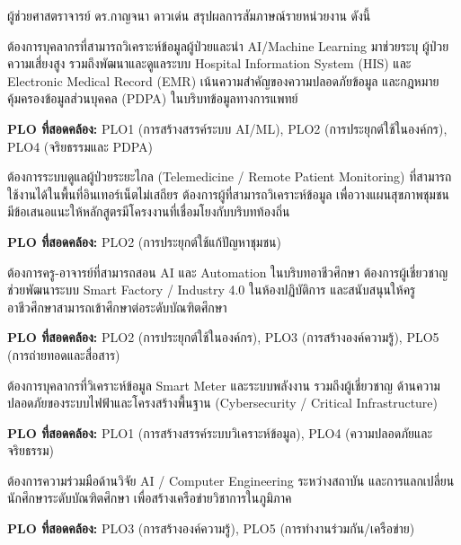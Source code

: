 \documentclass{meetingminutes}
\begin{document}
\vspace{8pt}
\noindent ผู้ช่วยศาสตราจารย์ ดร.กาญจนา ดาวเด่น สรุปผลการสัมภาษณ์รายหน่วยงาน ดังนี้


ต้องการบุคลากรที่สามารถวิเคราะห์ข้อมูลผู้ป่วยและนำ AI/Machine Learning มาช่วยระบุ
ผู้ป่วยความเสี่ยงสูง รวมถึงพัฒนาและดูแลระบบ Hospital Information System (HIS)
และ Electronic Medical Record (EMR) เน้นความสำคัญของความปลอดภัยข้อมูล
และกฎหมายคุ้มครองข้อมูลส่วนบุคคล (PDPA) ในบริบทข้อมูลทางการแพทย์

\noindent\textbf{PLO ที่สอดคล้อง:} PLO1 (การสร้างสรรค์ระบบ AI/ML), PLO2 (การประยุกต์ใช้ในองค์กร), PLO4 (จริยธรรมและ PDPA)


ต้องการระบบดูแลผู้ป่วยระยะไกล (Telemedicine / Remote Patient Monitoring)
ที่สามารถใช้งานได้ในพื้นที่อินเทอร์เน็ตไม่เสถียร ต้องการผู้ที่สามารถวิเคราะห์ข้อมูล
เพื่อวางแผนสุขภาพชุมชน มีข้อเสนอแนะให้หลักสูตรมีโครงงานที่เชื่อมโยงกับบริบทท้องถิ่น

\noindent\textbf{PLO ที่สอดคล้อง:} PLO2 (การประยุกต์ใช้แก้ปัญหาชุมชน)


ต้องการครู-อาจารย์ที่สามารถสอน AI และ Automation ในบริบทอาชีวศึกษา
ต้องการผู้เชี่ยวชาญช่วยพัฒนาระบบ Smart Factory / Industry 4.0 ในห้องปฏิบัติการ
และสนับสนุนให้ครูอาชีวศึกษาสามารถเข้าศึกษาต่อระดับบัณฑิตศึกษา

\noindent\textbf{PLO ที่สอดคล้อง:} PLO2 (การประยุกต์ใช้ในองค์กร), PLO3 (การสร้างองค์ความรู้), PLO5 (การถ่ายทอดและสื่อสาร)


ต้องการบุคลากรที่วิเคราะห์ข้อมูล Smart Meter และระบบพลังงาน รวมถึงผู้เชี่ยวชาญ
ด้านความปลอดภัยของระบบไฟฟ้าและโครงสร้างพื้นฐาน (Cybersecurity / Critical Infrastructure)

\noindent\textbf{PLO ที่สอดคล้อง:} PLO1 (การสร้างสรรค์ระบบวิเคราะห์ข้อมูล), PLO4 (ความปลอดภัยและจริยธรรม)


ต้องการความร่วมมือด้านวิจัย AI / Computer Engineering ระหว่างสถาบัน
และการแลกเปลี่ยนนักศึกษาระดับบัณฑิตศึกษา เพื่อสร้างเครือข่ายวิชาการในภูมิภาค

\noindent\textbf{PLO ที่สอดคล้อง:} PLO3 (การสร้างองค์ความรู้), PLO5 (การทำงานร่วมกัน/เครือข่าย)

\end{document}
